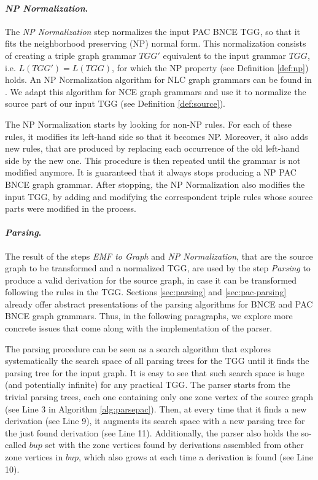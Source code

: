 \paragraph*{\emph{NP Normalization}.} The \emph{NP Normalization} step normalizes the input PAC BNCE TGG, so that it fits the neighborhood preserving (NP) normal form. This normalization consists of creating a triple graph grammar $TGG'$ equivalent to the input grammar $TGG$, i.e. $L(TGG') = L(TGG)$, for which the NP property (see Definition \ref{def:np}) holds. An NP Normalization algorithm for NLC graph grammars can be found in \citep{rozenberg1986boundary}. We adapt this algorithm for NCE graph grammars and use it to normalize the source part of our input TGG (see Definition \ref{def:source}).

The NP Normalization starts by looking for non-NP rules. For each of these rules, it modifies its left-hand side so that it becomes NP. Moreover, it also adds new rules, that are produced by replacing each occurrence of the old left-hand side by the new one. This procedure is then repeated until the grammar is not modified anymore. It is guaranteed that it always stops producing a NP PAC BNCE graph grammar. After stopping, the NP Normalization also modifies the input TGG, by adding and modifying the correspondent triple rules whose source parts were modified in the process.

\paragraph*{\emph{Parsing}.} The result of the steps \emph{EMF to Graph} and \emph{NP Normalization}, that are the source graph to be transformed and a normalized TGG, are used by the step \emph{Parsing} to produce a valid derivation for the source graph, in case it can be transformed following the rules in the TGG. Sections \ref{sec:parsing} and \ref{sec:pac-parsing} already offer abstract presentations of the parsing algorithms for BNCE and PAC BNCE graph grammars. Thus, in the following paragraphs, we explore more concrete issues that come along with the implementation of the parser.

The parsing procedure can be seen as a search algorithm that explores systematically the search space of all parsing trees for the TGG until it finds the parsing tree for the input graph. It is easy to see that such search space is huge (and potentially infinite) for any practical TGG. The parser starts from the trivial parsing trees, each one containing only one zone vertex of the source graph (see Line 3 in Algorithm \ref{alg:parsepac}). Then, at every time that it finds a new derivation (see Line 9), it augments its search space with a new parsing tree for the just found derivation (see Line 11). Additionally, the parser also holds the so-called $bup$ set with the zone vertices found by derivations assembled from other zone vertices in $bup$, which also grows at each time a derivation is found (see Line 10).

